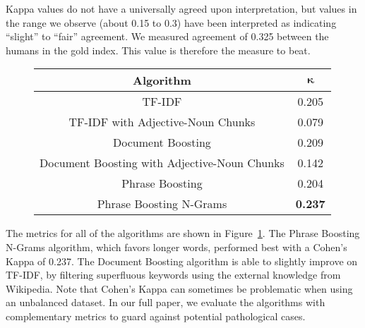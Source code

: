 Kappa values do not have a universally agreed upon interpretation, but
values in the range we observe (about 0.15 to 0.3) have been
interpreted as indicating ``slight'' to ``fair'' agreement. We measured
agreement of 0.325 between the humans in the gold index. This value is
therefore the measure to beat.


\begin{figure}[!ht]
\caption{}
\label{fig:main_result}
\begin{tabular}{|c|c|}
\hline
\textbf{Algorithm} & $\mathbf{\kappa}$ \\
\hline
TF-IDF & 0.205 \\
\hline
TF-IDF with Adjective-Noun Chunks & 0.079 \\
\hline
Document Boosting & 0.209 \\
\hline
Document Boosting with Adjective-Noun Chunks & 0.142 \\
\hline
Phrase Boosting & 0.204 \\
\hline
Phrase Boosting N-Grams & \textbf{0.237} \\
\hline
\end{tabular}
\end{figure}

The metrics for all of the algorithms are shown in
Figure~\ref{fig:main_result}. The Phrase Boosting N-Grams algorithm,
which favors longer words, performed best with a Cohen's Kappa of
0.237. The Document Boosting algorithm is able to slightly improve on TF-IDF,
by filtering superfluous keywords using the external knowledge from Wikipedia.
Note that Cohen's Kappa can sometimes be problematic when using an unbalanced
dataset. In our full paper, we evaluate the algorithms with complementary
metrics to guard against potential pathological cases.

